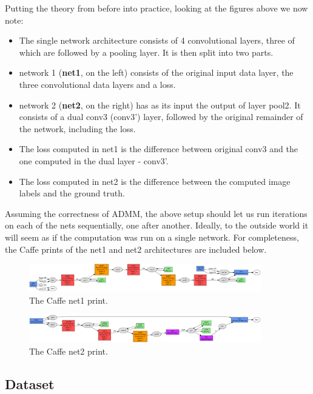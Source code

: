 \documentclass[a4paper, 12pt]{article}
\numberwithin{equation}{section}
\begin{document}
	Putting the theory from before into practice, looking at the figures above we now note:
	\begin{itemize}
		\item The single network architecture consists of 4 convolutional layers, three of which are followed by a pooling layer. It is then split into two parts.
		\item network 1 (\textbf{net1}, on the left) consists of the original input data layer, the three convolutional data layers and a loss.
		\item network 2 (\textbf{net2}, on the right) has as its input the output of layer pool2. It consists of a dual conv3 (conv3') layer, followed by the original remainder of the network, including the loss.
		\item The loss computed in net1 is the difference between original conv3 and the one computed in the dual layer - conv3'.
		\item The loss computed in net2 is the difference between the computed image labels and the ground truth.
	\end{itemize}
	
	Assuming the correctness of ADMM, the above setup should let us run iterations on each of the nets sequentially, one after another. Ideally, to the outside world it will seem as if the computation was run on a single network. For completeness, the Caffe prints of the net1 and net2 architectures are included below.
	
	\begin{figure}[!h]
		\centering
		\includegraphics[page=1,width=0.9\textwidth]{net1.png}
		\caption{\label{fig:net1}{The Caffe net1 print.}}
	\end{figure}
	
	\begin{figure}[!h]
		\centering
		\includegraphics[page=1,width=0.9\textwidth]{net2.png}
		\caption{\label{fig:net1}{The Caffe net2 print.}}
	\end{figure}
	
	\subsection{Dataset}
	
\end{document}
